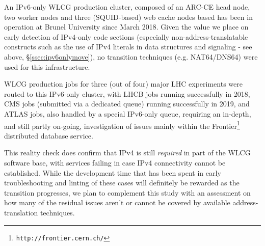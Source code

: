 %
An IPv6-only WLCG production cluster, composed of an ARC-CE head node,
two worker nodes and three (SQUID-based) web cache nodes based has been
in operation at Brunel University since March 2018. Given the value
we place on early detection of IPv4-only code sections (especially
non-address-translatable constructs such as the use of IPv4 literals in
data structures and signaling - see above, \S\ref{ssec:ipv6onlymove}),
no transition techniques (e.g. NAT64/DNS64) were used for this
infrastructure.
\par
WLCG production jobs for three (out of four) major LHC experiments were routed
to this IPv6-only cluster, with LHCB jobs running successfully in
2018, CMS jobs (submitted via a dedicated queue) running successfully in 2019,
and ATLAS jobs, also handled by a special IPv6-only queue, requiring an
in-depth, and still partly on-going, investigation of issues mainly within the
Frontier\footnote{\tt http://frontier.cern.ch/} distributed database
service.
\par
This reality check does confirm that IPv4 is still {\it required} in part
of the WLCG software base, with services failing in case IPv4 connectivity
cannot be established. While the development time that has been spent in 
early troubleshooting and linting of these cases will definitely be rewarded
as the transition progresses, we plan to complement this study with 
an assessment on how many of the residual issues aren't or cannot be covered
by available address-translation techniques.

